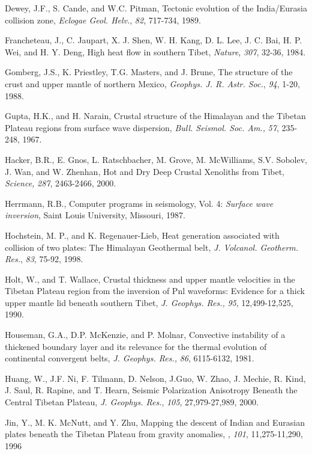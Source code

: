\documentclass[12pt]{article}
\begin{document}
\begin{references}
Dewey, J.F., S. Cande, and W.C. Pitman, Tectonic evolution of the India/Eurasia
collision zone, {\it Eclogae Geol. Helv.}, {\it 82}, 717-734, 1989.

Francheteau, J., C. Jaupart, X. J. Shen, W. H. Kang, D. L. Lee,
J. C. Bai, H. P. Wei, and H. Y. Deng, High heat flow in southern
Tibet, {\it Nature}, {\it 307}, 32-36, 1984.

Gomberg, J.S., K. Priestley, T.G. Masters, and J. Brune, The structure of the crust
and upper mantle of northern
Mexico, {\it Geophys. J. R. Astr. Soc.}, {\it 94}, 1-20, 1988.

Gupta, H.K., and H. Narain, Crustal structure of the Himalayan and
the Tibetan Plateau regions from surface wave dispersion, {\it Bull. Seismol.
Soc. Am.,} {\it 57}, 235-248, 1967.

Hacker, B.R., E. Gnos, L. Ratschbacher, M. Grove, M. McWilliams, S.V. Sobolev,
J. Wan, and W. Zhenhan, Hot and Dry Deep Crustal Xenoliths from Tibet,
{\it Science,} {\it 287}, 2463-2466, 2000.

Herrmann, R.B., Computer programs in seismology, Vol. 4:
{\it Surface wave inversion}, Saint Louis University, Missouri, 1987.

Hochstein, M. P., and K. Regenauer-Lieb, Heat generation associated
with collision of two plates: The Himalayan Geothermal belt, {\it
J. Volcanol. Geotherm. Res.}, {\it 83}, 75-92, 1998.

Holt, W., and T. Wallace, Crustal thickness and upper mantle velocities
in the Tibetan Plateau region from the inversion of Pnl waveforms: Evidence
for a thick upper mantle lid beneath southern Tibet, {\it J. Geophys. Res.,}
{\it 95}, 12,499-12,525, 1990.

Houseman, G.A., D.P. McKenzie, and P. Molnar, Convective instability
of a thickened boundary layer and its relevance for the thermal evolution of
continental convergent belts, {\it J. Geophys. Res.,} {\it 86}, 6115-6132, 1981.

Huang, W., J.F. Ni, F. Tilmann, D. Nelson, J.Guo, W. Zhao, J. Mechie,
R. Kind, J. Saul, R. Rapine, and T. Hearn, Seismic Polarization
Anisotropy Beneath the Central Tibetan Plateau, {\it J. Geophys. Res.},
{\it 105}, 27,979-27,989, 2000.

Jin, Y., M. K. McNutt, and Y. Zhu, Mapping the descent of Indian and
Eurasian plates beneath the Tibetan Plateau from gravity anomalies,
\jgr, {\it 101}, 11,275-11,290, 1996


\end{references}
\end{document}

